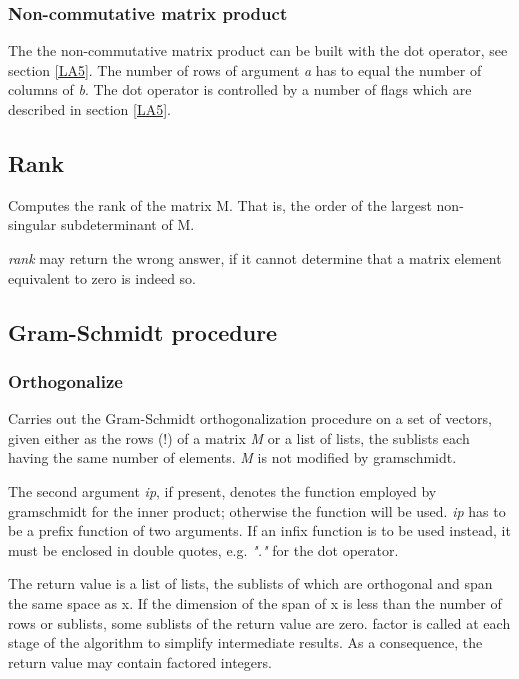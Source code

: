\documentclass[../Maxima_Workbook.tex]{subfiles}
\begin{document}
\subsubsection{Non-commutative matrix product}\label{LA4}

The the non-commutative matrix product can be built with the dot operator, see section \ref{LA5}. The number of rows of argument \emph{a} has to equal the number of columns of \emph{b}. The dot operator is controlled by a number of flags which are described in section \ref{LA5}.

\subsection{Rank}

\lz {} \hfill \tcr{[function]}

\lz Computes the rank of the matrix M. That is, the order of the largest non-singular
subdeterminant of M.

\lz \emph{rank} may return the wrong answer, if it cannot determine that a matrix element equivalent to zero is indeed so.

\subsection{Gram-Schmidt procedure}

\subsubsection{Orthogonalize}

\lz {} \hfill {}

\lz Carries out the Gram-Schmidt orthogonalization procedure on a set of vectors, given either as the rows (!) of a matrix \emph{M} or a list of lists, the sublists each having the same number of elements. \emph{M} is not modified by gramschmidt. 

\lz The second argument \emph{ip}, if present, denotes the function employed by gramschmidt for the inner product; otherwise the function  will be used. \emph{ip} has to be a prefix function of two arguments. If an infix function is to be used instead, it must be enclosed in double quotes, e.g. \emph{"."} for the dot operator.

\lz The return value is a list of lists, the sublists of which are orthogonal and span the same space as x. If the dimension of the span of x is less than the number of rows or sublists, some sublists of the return value are zero. factor is called at each stage of the algorithm to simplify intermediate results. As a consequence, the return value may contain factored integers.
\end{document}
